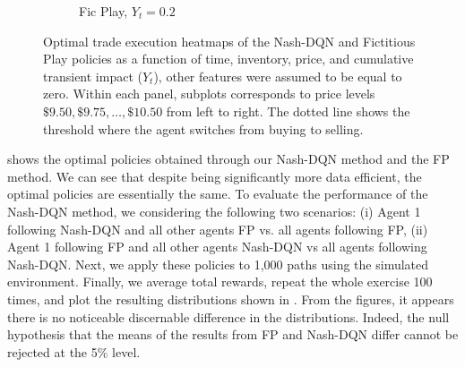 \documentclass[onefignum,onetabnum]{siamonline171218}
\begin{document}
\begin{figure}[t!]
\begin{subfigure}{.32\textwidth}
  \caption{Fic Play, $Y_{t}=0.2$}
\end{subfigure}
\caption{Optimal trade execution heatmaps of the Nash-DQN and Fictitious Play policies as a function of time, inventory, price, and cumulative transient impact ($Y_t$), other features were assumed to be equal to zero. Within each panel,  subplots corresponds to  price levels $\$9.50,\$9.75,\dots,\$10.50$ from left to right. The dotted line shows the threshold where the agent switches from buying to selling.  
\label{fig:PolicyHeatmaps}}
\end{figure}

 shows the optimal policies obtained through our Nash-DQN method and the FP method. We can see that despite being significantly more data efficient, the optimal policies are essentially the same. To evaluate the performance of the Nash-DQN method, we considering the following two scenarios: (i) Agent 1 following Nash-DQN and all other agents FP vs. all agents following FP, (ii) Agent 1 following FP and all other agents Nash-DQN vs all agents following Nash-DQN. Next, we apply these policies to 1,000 paths using the simulated environment. Finally, we average total rewards, repeat the whole exercise 100 times, and plot the resulting distributions shown in . From the figures, it appears there is no noticeable discernable difference in the distributions. Indeed, the null hypothesis that the means of the results from FP and Nash-DQN differ cannot be rejected at the 5\% level.
\end{document}

